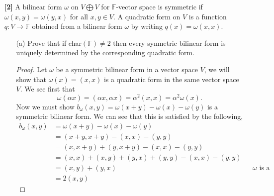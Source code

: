 \documentclass[12pt]{article}
\newcommand      {\Rm}         {{\mathbb R}}
\newcommand      {\Fm}          {{\mathbb F}}
\begin{document}
\begin{itemize}
\begin{itemize}
\begin{proof}
            We see when we integrate with respect to the variable we took the partial derivative of that we do not get the same functions. This is why the differential map cannot be surjective. 


            The differential map can't be injective either. Consider $f: \Rm^3 \to \Rm$, defined by $f(x,y,z) \mapsto C$ where $C$ is simply a constant. We see when we take d$(f)$ we will get,
            \begin{align*}
                \text{d}(f) = \begin{pmatrix}0\\ 0\\ 0 \end{pmatrix} = 0
            \end{align*}

            We know though there are an infinite number of constant functions to choose from but these constant functions when plugging into the differential map will all map to 0 meaning the differential map is not injective. 

            Thus we have it that the differntial map as defined in part b is neither injective nor surjective. 

        \end{proof}
        
        
    \end{itemize}    
\newpage
    \textbf{Resubmission}
    \item[\textbf{[2]}] A bilinear form $\omega$ on $V \bigoplus V $ for $\Fm$-vector space is symmetric if $\omega(x,y) = \omega(y,x)$ for all $x,y \in V$. A quadratic form on $V$ is a function $q:V\to \Fm$ obtained from a bilinear form $\omega$ by writing $q(x) = \omega(x,x)$.
    \begin{itemize}
        \item[(a)] Prove that if char$(\Fm)\neq 2$ then every synmetric bilinear form is uniquely determined by the corresponding quadratic form. 
        \begin{proof}
            Let $\omega$ be a symmetric bilinear form in a vector space $V$, we will show that $\omega(x) = (x,x)$ is a quadratic form in the same vector space $V$. We see first that \[\omega(\alpha x) = (\alpha x, \alpha x) = \alpha^2(x,x) = \alpha^2 \omega(x).\] Now we must show $b_\omega(x,y) = \omega(x+y) -\omega(x) - \omega(y)$ is a symmetric bilinear form. We can see that this is satisfied by the following,
            \begin{align*}
                b_\omega(x,y) &= \omega(x+y) - \omega(x) - \omega(y) \\
                &= (x+y, x+y) - (x,x) - (y,y) \\ 
                &= (x,x+y) + (y,x+y) - (x,x) - (y,y) \\
                &= (x,x) + (x,y) + (y,x) + (y,y) - (x,x) - (y,y) \\
                &= (x,y) + (y,x) && \text{$\omega$ is a symmetric bilinear form so,} \\
                &= 2(x,y)
            \end{align*}


\end{proof}
\end{itemize}
\end{itemize}
\end{document}
